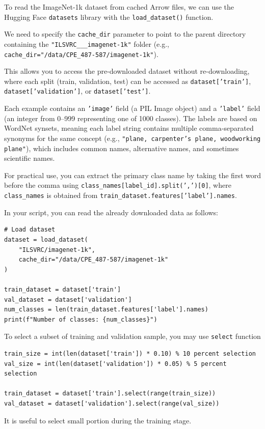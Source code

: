 \documentclass[12pt, xcolor=dvipsnames,svgnames,x11names]{article}
\begin{document}
To read the ImageNet-1k dataset from cached Arrow files, we can use the Hugging Face \texttt{datasets} library with the \texttt{load_dataset()} function.


We need to specify the \texttt{cache_dir} parameter to point to the parent directory containing the \texttt{"ILSVRC___imagenet-1k"} folder (e.g., \texttt{cache_dir="/data/CPE_487-587/imagenet-1k"}). 

This allows you to access the pre-downloaded dataset without re-downloading, where each split (train, validation, test) can be accessed as \texttt{dataset['train']}, \texttt{dataset['validation']}, or \texttt{dataset['test']}. 

Each example contains an \texttt{'image'} field (a PIL Image object) and a \texttt{'label'} field (an integer from 0--999 representing one of 1000 classes). The labels are based on WordNet synsets, meaning each label string contains multiple comma-separated synonyms for the same concept (e.g., \texttt{"plane, carpenter's plane, woodworking plane"}), which includes common names, alternative names, and sometimes scientific names. 

For practical use, you can extract the primary class name by taking the first word before the comma using \texttt{class_names[label_id].split(',')[0]}, where \texttt{class_names} is obtained from \texttt{train_dataset.features['label'].names}.



In your script, you can read the already downloaded data as follows:

\begin{verbatim}
# Load dataset
dataset = load_dataset(
    "ILSVRC/imagenet-1k",
    cache_dir="/data/CPE_487-587/imagenet-1k"
)

train_dataset = dataset['train']
val_dataset = dataset['validation']
num_classes = len(train_dataset.features['label'].names)
print(f"Number of classes: {num_classes}")

\end{verbatim}

To select a subset of training and validation sample, you may use \texttt{select} function


\begin{verbatim}
train_size = int(len(dataset['train']) * 0.10) % 10 percent selection
val_size = int(len(dataset['validation']) * 0.05) % 5 percent selection

train_dataset = dataset['train'].select(range(train_size))
val_dataset = dataset['validation'].select(range(val_size))

\end{verbatim}
It is useful to select small portion during the training stage.
\end{document}
